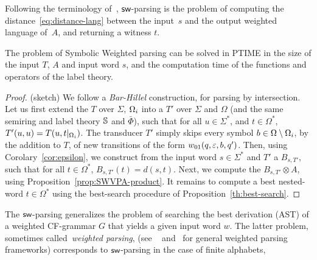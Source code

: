 %
Following the terminology of~\cite{Mohri03EDWA},
$\textsf{sw}$-parsing is the problem of computing
the distance~\eqref{eq:distance-lang} between the input~$s$ and the output weighted language of~$A$,
and returning a witness $t$.
%
%
\begin{proposition}
The problem of Symbolic Weighted  parsing
can be solved in PTIME in the size of the input \SWT $T$, \SWVPA $A$
and input word $s$,
and the computation time of the functions and operators of the label theory.
\end{proposition}
%
\begin{proof} (sketch)
We follow a \emph{Bar-Hillel} construction, for parsing by intersection.
%
\noindent
Let us first extend the \SWT $T$ over $\Sigma$, $\Omegai$
into a \SWT $T'$ over $\Sigma$ and $\Omega$
(and the same semiring and label theory $\mathbb{S}$ and $\bar\Phi$),
such that for all $u \in \Sigma^*$, and $t \in {\Omega}^*$,
$T'(u, u) = T(u, t|_{\Omegai})$.
%
The transducer $T'$ simply skips every symbol
$b \in {\Omega} \setminus \Omegai$,
by the addition to $T$,
of new transitions of the form $\wei_{01}(q, \varepsilon, b, q')$.
%
\noindent
Then, using Corolary~\ref{cor:epsilon},
we construct from the input word $s \in \Sigma^*$ and $T'$
a \SWA $B_{s, T'}$,
such that for all $t \in \Omega^*$, $B_{s, T'}(t) = d(s, t)$.
%
%
\noindent
Next, %
we compute the \SWVPA $B_{s, T'} \otimes A$,
using Proposition~\ref{prop:SWVPA-product}.
%
\noindent
It remains to compute a best nested-word $t \in {\Omega}^*$
using the best-search procedure of Proposition~\ref{th:best-search}.
\end{proof}
The $\textsf{sw}$-parsing generalizes
the problem of searching the best derivation (AST) of a weighted CF-grammar $G$
that yields a given input word $w$.
The latter problem, sometimes called~\emph{weighted parsing},
(see \eg~\cite{Goodman99SemiringParsing}
 and~\cite{MorbitzVogler19weighted-parsing} for general weighted parsing frameworks)
corresponds to $\textsf{sw}$-parsing in the case of finite alphabets,
